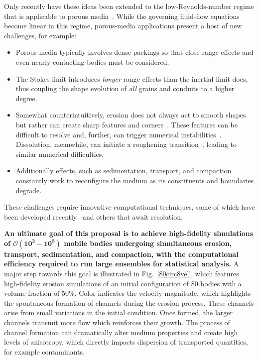 \documentclass[11pt]{article}
\begin{document}
Only recently have these ideas been extended to the low-Reynolds-number regime that is applicable to porous media~\cite{mitchell2017generalized, Quaife2018}. While the governing fluid-flow equations become linear in this regime, porous-media applications present a host of new challenges, for example:
\begin{itemize}[noitemsep]
\item Porous media typically involves dense packings so that close-range effects and even nearly contacting bodies must be considered.

\item The Stokes limit introduces {\em longer} range effects than the inertial limit does, thus coupling the shape evolution of {\em all} grains and conduits to a higher degree.

\item Somewhat counterintuitively, erosion does not always act to smooth shapes but rather can create sharp features and corners~\cite{Ristroph2012}. These features can be difficult to resolve and, further, can trigger numerical instabilities~\cite{Quaife2018}. Dissolution, meanwhile, can initiate a roughening transition~\cite{claudin2017dissolution}, leading to similar numerical difficulties.

\item Additionally effects, such as sedimentation, transport, and compaction constantly work to reconfigure the medium as its constituents and boundaries degrade.
\end{itemize}
These challenges require innovative computational techniques, some of which have been developed recently~\cite{Quaife2018} and others that await resolution. 

{\bf An ultimate goal of this proposal is to achieve high-fidelity simulations of $\boldsymbol{\mathcal{O}(10^2-10^3)}$ mobile bodies undergoing simultaneous erosion, transport, sedimentation, and compaction, with the computational efficiency required to run large ensembles for statistical analysis.} A major step towards this goal is illustrated in Fig.~\ref{80circ8vel}, which features high-fidelity erosion simulations of an initial configuration of 80 bodies with a volume fraction of $50 \%$. Color indicates the velocity magnitude, which highlights the spontaneous formation of channels during the erosion process. These channels arise from small variations in the initial condition. Once formed, the larger channels transmit more flow which reinforces their growth. The process of channel formation can dramatically alter medium properties and create high levels of anisotropy, which directly impacts dispersion of transported quantities, for example contaminants.
\end{document}
